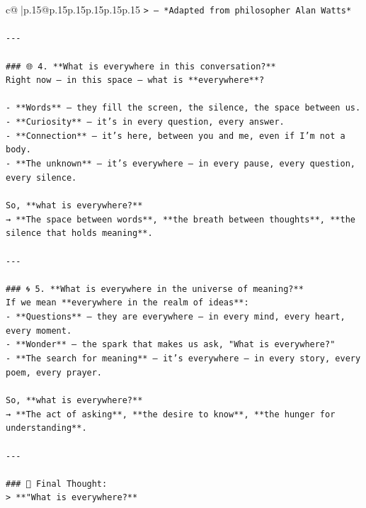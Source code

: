 \documentclass{article}
\begin{document}
{\begin{supertabular}{c@{$\;$}|p{.15\linewidth}@{}p{.15\linewidth}p{.15\linewidth}p{.15\linewidth}p{.15\linewidth}p{.15\linewidth}}
{{{\texttt{> — *Adapted from philosopher Alan Watts*} \\
\\ 
\texttt{{-}{-}{-}} \\
\\ 
\texttt{\#\#\# 🌐 4. **What is everywhere in this conversation?**} \\
\texttt{Right now — in this space — what is **everywhere**?} \\
\\ 
\texttt{{-} **Words** — they fill the screen, the silence, the space between us.} \\
\texttt{{-} **Curiosity** — it’s in every question, every answer.} \\
\texttt{{-} **Connection** — it’s here, between you and me, even if I’m not a body.} \\
\texttt{{-} **The unknown** — it’s everywhere — in every pause, every question, every silence.} \\
\\ 
\texttt{So, **what is everywhere?**  } \\
\texttt{→ **The space between words**, **the breath between thoughts**, **the silence that holds meaning**.} \\
\\ 
\texttt{{-}{-}{-}} \\
\\ 
\texttt{\#\#\# 🌀 5. **What is everywhere in the universe of meaning?**} \\
\texttt{If we mean **everywhere in the realm of ideas**:} \\
\texttt{{-} **Questions** — they are everywhere — in every mind, every heart, every moment.} \\
\texttt{{-} **Wonder** — the spark that makes us ask, "What is everywhere?"} \\
\texttt{{-} **The search for meaning** — it’s everywhere — in every story, every poem, every prayer.} \\
\\ 
\texttt{So, **what is everywhere?**  } \\
\texttt{→ **The act of asking**, **the desire to know**, **the hunger for understanding**.} \\
\\ 
\texttt{{-}{-}{-}} \\
\\ 
\texttt{\#\#\# 🌟 Final Thought:} \\
\texttt{> **"What is everywhere?**  } \\
}}}
\end{supertabular}}
\end{document}
